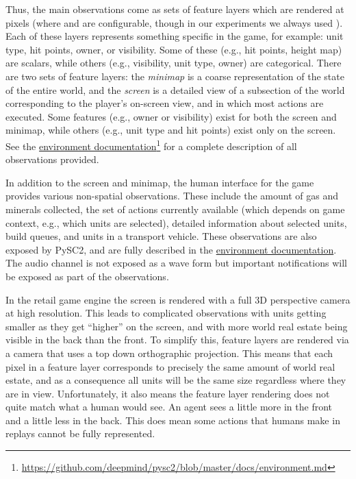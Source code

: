 \documentclass{article}
\newcommand{\footref}[2]{\href{#1}{#2}\footnote{\url{#1}}}
\begin{document}
Thus, the main observations come as sets of feature layers which are rendered at  pixels (where  and  are configurable, though in our experiments we always used ). Each of these layers represents something specific in the game, for example: unit type, hit points, owner, or visibility. Some of these (e.g., hit points, height map) are scalars, while others (e.g., visibility, unit type, owner) are categorical. There are two sets of feature layers: the \emph{minimap} is a coarse representation of the state of the entire world, and the \emph{screen} is a detailed view of a subsection of the world corresponding to the player's on-screen view, and in which most actions are executed. Some features (e.g., owner or visibility) exist for both the screen and minimap, while others (e.g., unit type and hit points) exist only on the screen. See the \footref{https://github.com/deepmind/pysc2/blob/master/docs/environment.md}{environment documentation} for a complete description of all observations provided.

In addition to the screen and minimap, the human interface for the game provides various non-spatial observations. These include the amount of gas and minerals collected, the set of actions currently available (which depends on game context, e.g., which units are selected), detailed information about selected units, build queues, and units in a transport vehicle. These observations are also exposed by PySC2, and are fully described in the \href{https://github.com/deepmind/pysc2/blob/master/docs/environment.md}{environment documentation}. The audio channel is not exposed as a wave form but important notifications will be exposed as part of the observations.

In the retail game engine the screen is rendered with a full 3D perspective camera at high resolution. This leads to complicated observations with units getting smaller as they get ``higher'' on the screen, and with more world real estate being visible in the back than the front. To simplify this, feature layers are rendered via a camera that uses a top down orthographic projection. This means that each pixel in a feature layer corresponds to precisely the same amount of world real estate, and as a consequence all units will be the same size regardless where they are in view. Unfortunately, it also means the feature layer rendering does not quite match what a human would see. An agent sees a little more in the front and a little less in the back. This does mean some actions that humans make in replays cannot be fully represented.
\end{document}
